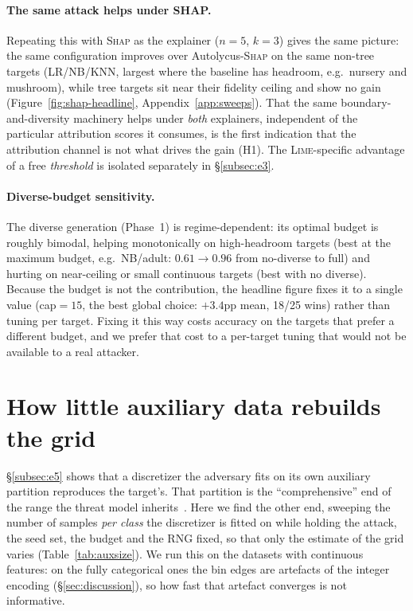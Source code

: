\documentclass[sigconf,anonymous,review]{acmart}
\begin{document}
\paragraph{The same attack helps under SHAP.}
Repeating this with \textsc{Shap} as the explainer ($n{=}5$, $k{=}3$) gives the same picture: the
same configuration improves over Autolycus-\textsc{Shap} on the same non-tree targets (LR/NB/KNN,
largest where the baseline has headroom, e.g.\ nursery and mushroom), while tree targets sit near
their fidelity ceiling and show no gain (Figure~\ref{fig:shap-headline}, Appendix~\ref{app:sweeps}).
That the same boundary-and-diversity machinery helps under \emph{both} explainers, independent of the particular attribution scores it consumes, is the first indication that the attribution channel is
not what drives the gain (H1). The \textsc{Lime}-specific advantage of a free \emph{threshold} is
isolated separately in \S\ref{subsec:e3}.

\paragraph{Diverse-budget sensitivity.}
The diverse generation (Phase~1) is regime-dependent: its optimal budget is roughly bimodal,
helping monotonically on high-headroom targets (best at the maximum budget, e.g.\ NB/adult:
$0.61{\to}0.96$ from no-diverse to full) and hurting on near-ceiling or small continuous targets
(best with no diverse). Because the budget is not the contribution, the headline figure fixes it
to a single value (cap${=}15$, the best global choice: $+3.4$pp mean, 18/25 wins) rather than
tuning per target. Fixing it this way costs accuracy on the targets that prefer a different budget,
and we prefer that cost to a per-target tuning that would not be available to a real attacker.

\section{How little auxiliary data rebuilds the grid}
\label{app:auxsize}
\S\ref{subsec:e5} shows that a discretizer the adversary fits on its own auxiliary partition
reproduces the target's. That partition is the ``comprehensive'' end of the range the threat model
inherits~\cite{oksuz2024autolycus}. Here we find the other end, sweeping the number of samples
\emph{per class} the discretizer is fitted on while holding the attack, the seed set, the budget and
the RNG fixed, so that only the estimate of the grid varies (Table~\ref{tab:auxsize}). We run this on
the datasets with continuous features: on the fully categorical ones the bin edges are artefacts of
the integer encoding (\S\ref{sec:discussion}), so how fast that artefact converges is not informative.
\end{document}
